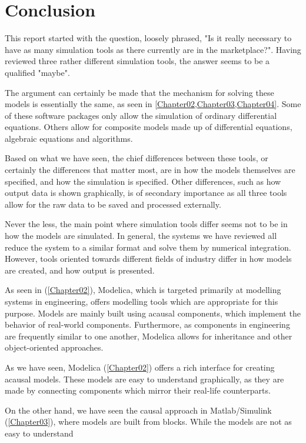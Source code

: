 \documentclass[\rootfolder/main.tex]{subfiles}
\begin{document}
\chapter{Conclusion} %

\label{Chapter06} %

This report started with the question, loosely phrased, "Is it really necessary to have as many simulation tools as there currently are in the marketplace?".
Having reviewed three rather different simulation tools, the answer seems to be a qualified "maybe".

The argument can certainly be made that the mechanism for solving these models is essentially the same, as seen in \cref{Chapter02,Chapter03,Chapter04}.
Some of these software packages only allow the simulation of ordinary differential equations.
Others allow for composite models made up of differential equations, algebraic equations and algorithms.

Based on what we have seen, the chief differences between these tools, or certainly the differences that matter most, are in how the models themselves are specified, and how the simulation is specified.
Other differences, such as how output data is shown graphically, is of secondary importance as all three tools allow for the raw data to be saved and processed externally.

Never the less, the main point where simulation tools differ seems not to be in how the models are simulated.
In general, the systems we have reviewed all reduce the system to a similar format and solve them by numerical integration.
However, tools oriented towards different fields of industry differ in how models are created, and how output is presented.

As seen in (\cref{Chapter02}), Modelica, which is targeted primarily at modelling systems in engineering, offers modelling tools which are appropriate for this purpose.
Models are mainly built using acausal components, which implement the behavior of real-world components.
Furthermore, as components in engineering are frequently similar to one another, Modelica allows for inheritance and other object-oriented approaches.

As we have seen, Modelica (\cref{Chapter02}) offers a rich interface for creating acausal models.
These models are easy to understand graphically, as they are made by connecting components which mirror their real-life counterparts.

On the other hand, we have seen the causal approach in Matlab/Simulink (\cref{Chapter03}), where models are built from blocks.
While the models are not as easy to understand 
\end{document}
